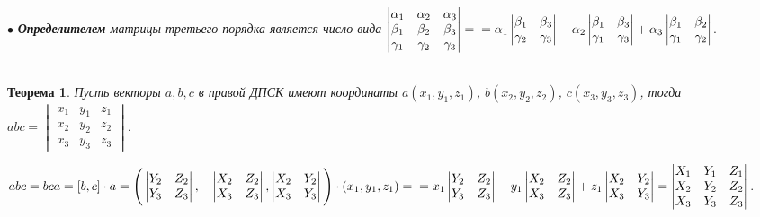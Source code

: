 $\bullet$ \textit{\textbf{Определителем} матрицы третьего порядка является число вида} $\begin{vmatrix} \alpha_1 & \alpha_2 & \alpha_3 \\ 
	\beta_1 & \beta_2 & \beta_3 \\ \gamma_1 & \gamma_2 & \gamma_3 \end{vmatrix} = \\ = \alpha_1 \begin{vmatrix} \beta_1 & \beta_3 \\ \gamma_2 & \gamma_3 \end{vmatrix} - \alpha_2 \begin{vmatrix} \beta_1 & \beta_3 \\ \gamma_1 & \gamma_3 \end{vmatrix} + \alpha_3 \begin{vmatrix} \beta_1 & \beta_2 \\ \gamma_1 & \gamma_2 \end{vmatrix}$. \\\\
\newtheorem*{t3_6_2}{Теорема}\begin{t3_6_2}
	Пусть векторы $a, b, c$ в правой ДПСК имеют координаты $a(x_1, y_1, z_1)$, $b(x_2, y_2, z_2)$, $c(x_3, y_3, z_3)$, тогда $abc = \begin{vmatrix} x_1 & y_1 & z_1 \\ x_2 & y_2 & z_2 \\ x_3 & y_3 & z_3 \end{vmatrix}$. \end{t3_6_2}
\begin{Proof}
	$abc = bca = [b, c] \cdot a = \Bigg( \begin{vmatrix} Y_2 & Z_2 \\ Y_3 & Z_3 \end{vmatrix}, - \begin{vmatrix} X_2 & Z_2 \\ X_3 & Z_3 \end{vmatrix}, \begin{vmatrix} X_2 & Y_2 \\ X_3 & Y_3 \end{vmatrix} \Bigg) \cdot (x_1, y_1, z_1) = \\ = x_1 \begin{vmatrix} Y_2 & Z_2 \\ Y_3 & Z_3 \end{vmatrix} - y_1 \begin{vmatrix} X_2 & Z_2 \\ X_3 & Z_3 \end{vmatrix} + z_1 \begin{vmatrix} X_2 & Y_2 \\ X_3 & Y_3 \end{vmatrix} = \begin{vmatrix} X_1 & Y_1 & Z_1 \\ X_2 & Y_2 & Z_2 \\ X_3 & Y_3 & Z_3 \end{vmatrix}$.
\end{Proof}





